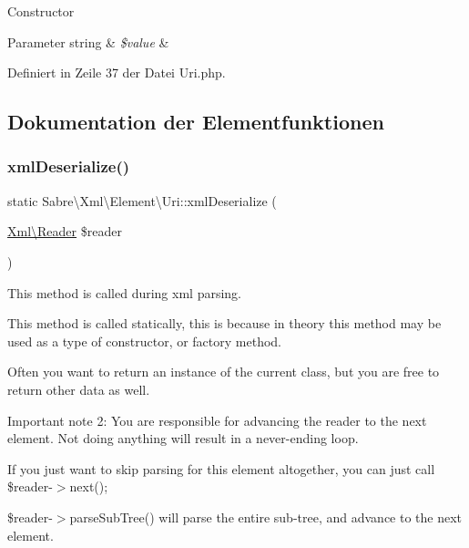Constructor


\begin{DoxyParams}[1]{Parameter}
string & {\em \$value} & \\
\hline
\end{DoxyParams}


Definiert in Zeile 37 der Datei Uri.\+php.



\subsection{Dokumentation der Elementfunktionen}
\mbox{\label{class_sabre_1_1_xml_1_1_element_1_1_uri_a651200284a4c3793ce568555720bfc77}} 
\subsubsection{\texorpdfstring{xml\+Deserialize()}{xmlDeserialize()}}
{\footnotesize\ttfamily static Sabre\textbackslash{}\+Xml\textbackslash{}\+Element\textbackslash{}\+Uri\+::xml\+Deserialize (\begin{DoxyParamCaption}\item[{\mbox{\hyperlink{class_sabre_1_1_xml_1_1_reader}{Xml\textbackslash{}\+Reader}}}]{\$reader }\end{DoxyParamCaption})\hspace{0.3cm}{\ttfamily [static]}}

This method is called during xml parsing.

This method is called statically, this is because in theory this method may be used as a type of constructor, or factory method.

Often you want to return an instance of the current class, but you are free to return other data as well.

Important note 2\+: You are responsible for advancing the reader to the next element. Not doing anything will result in a never-\/ending loop.

If you just want to skip parsing for this element altogether, you can just call \$reader-\/$>$next();

\$reader-\/$>$parse\+Sub\+Tree() will parse the entire sub-\/tree, and advance to the next element.


